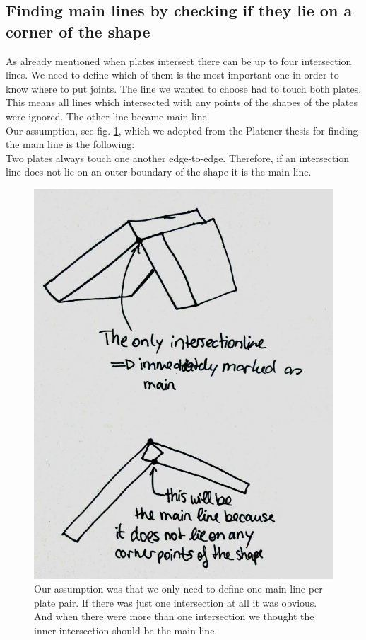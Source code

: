 \documentclass[../ClassicThesis.tex]{subfiles}
\begin{document}
\subsection{Finding main lines by checking if they lie on a corner of the shape}
As already mentioned when plates intersect there can be up to four intersection lines. We need to define which of them is the most important one in order to know where to put joints. The line we wanted to choose had to touch both plates.
This means all lines which intersected with any points of the shapes of the plates were ignored. The other line became main line.\\
Our assumption, see fig. \ref{fig:assumption}, which we adopted from the Platener thesis \cite{master-thesis} for finding the main line is the following:\\
Two plates always touch one another edge-to-edge. Therefore, if an intersection line does not lie on an outer boundary of the shape it is the main line.
\begin{figure}[!ht]
\centering
\includegraphics[width=.5\columnwidth]{Images/06-1-graph-assumptionMainLine.jpg}
\caption{Our assumption was that we only need to define one main line per plate pair. If there was just one intersection at all it was obvious. And when there were more than one intersection we thought the inner intersection should be the main line. }
\label{fig:assumption}
\end{figure}
\end{document}
